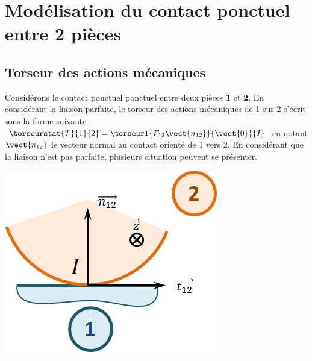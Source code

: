 \documentclass[10pt,fleqn]{article} %
\begin{document}

\vspace{1.5cm}
\pagestyle{fancy}
\thispagestyle{plain}



\section{Modélisation du contact ponctuel entre 2 pièces}
\subsection{Torseur des actions mécaniques}
\noindent\begin{minipage}[c]{.7\linewidth}
Considérons le contact ponctuel ponctuel entre deux pièces \textbf{1} et \textbf{2}. En considérant la liaison parfaite, le torseur des actions mécaniques de 1 sur 2 s'écrit sous la forme suivante : $\torseurstat{T}{1}{2}=\torseurl{F_{12} \vect{n_{12}}}{\vect{0}}{I}$ en notant $\vect{n_{12}}$ le vecteur normal au contact orienté de 1 vers 2. 
En considérant que la liaison n'est pas parfaite, plusieurs situation peuvent se présenter.  
\end{minipage}\hfill
\begin{minipage}[c]{.25\linewidth}
\begin{center}
\includegraphics[width=\linewidth]{images/fig_01}
\end{center}
\end{minipage}
\end{document}
